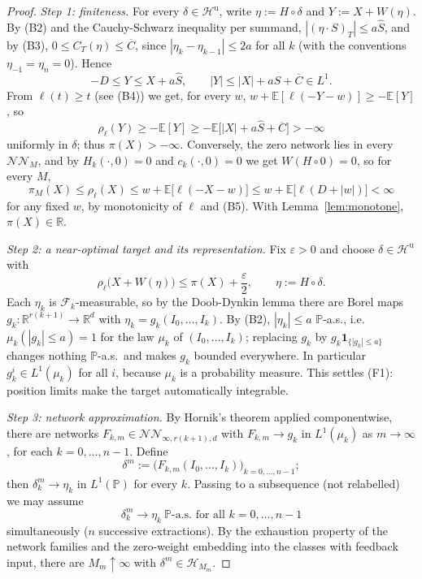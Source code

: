 \documentclass[11pt,a4paper]{report}
\numberwithin{equation}{chapter}
\theoremstyle{plain}
\theoremstyle{definition}
\newcommand{\E}{\mathbb{E}}
\newcommand{\PP}{\mathbb{P}}
\newcommand{\R}{\mathbb{R}}
\newcommand{\F}{\mathcal{F}}
\newcommand{\HH}{\mathcal{H}}
\newcommand{\Hu}{\mathcal{H}^{\mathrm{u}}}
\newcommand{\NNet}{\mathcal{N\!N}}
\newcommand{\as}{\ \PP\text{-a.s.}}
\begin{document}
\begin{proof}
    \emph{Step 1: finiteness.} For every $\delta\in\Hu$, write $\eta:=H\circ\delta$ and $Y:=X+W(\eta)$. By (B2) and the Cauchy-Schwarz inequality per summand, $|(\eta\cdot S)_T|\le a\widehat S$, and by (B3), $0\le C_T(\eta)\le\overline C$, since $|\eta_k-\eta_{k-1}|\le2a$ for all $k$ (with the conventions $\eta_{-1}=\eta_n=0$). Hence
    \begin{equation}\label{eq:sandwich}
        -D\le Y\le X+a\widehat S,\qquad|Y|\le|X|+a\widehat S+\overline C\in L^1.
    \end{equation}
    From $\ell(t)\ge t$ (see (B4)) we get, for every $w$, $w+\E[\ell(-Y-w)]\ge-\E[Y]$, so
    \[
        \rho_\ell(Y)\ge-\E[Y]\ge-\E\bigl[|X|+a\widehat S+\overline C\bigr]>-\infty
    \]
    uniformly in $\delta$; thus $\pi(X)>-\infty$. Conversely, the zero network lies in every $\NNet_M$, and by $H_k(\cdot,0)=0$ and $c_k(\cdot,0)=0$ we get $W(H\circ0)=0$, so for every $M$,
    \[
        \pi_M(X)\le\rho_\ell(X)\le w+\E\bigl[\ell(-X-w)\bigr]\le w+\E\bigl[\ell(D+|w|)\bigr]<\infty
    \]
    for any fixed $w$, by monotonicity of $\ell$ and (B5). With Lemma~\ref{lem:monotone}, $\pi(X)\in\R$.

    \emph{Step 2: a near-optimal target and its representation.} Fix $\varepsilon>0$ and choose $\delta\in\Hu$ with
    \begin{equation}\label{eq:near-opt}
        \rho_\ell\bigl(X+W(\eta)\bigr)\le\pi(X)+\frac{\varepsilon}{2},\qquad\eta:=H\circ\delta.
    \end{equation}
    Each $\eta_k$ is $\F_k$-measurable, so by the Doob-Dynkin lemma \cite[Lemma~1.13]{kallenberg} there are Borel maps $g_k\colon\R^{r(k+1)}\to\R^d$ with $\eta_k=g_k(I_0,\dots,I_k)$. By (B2), $|\eta_k|\le a$ $\PP$-a.s., i.e.\ $\mu_k(|g_k|\le a)=1$ for the law $\mu_k$ of $(I_0,\dots,I_k)$; replacing $g_k$ by $g_k\mathbf{1}_{\{|g_k|\le a\}}$ changes nothing $\PP$-a.s.\ and makes $g_k$ bounded everywhere. In particular $g_k^i\in L^1(\mu_k)$ for all $i$, because $\mu_k$ is a probability measure. This settles (F1): position limits make the target automatically integrable.

    \emph{Step 3: network approximation.} By Hornik's theorem \cite[Theorem~1]{hornik} applied componentwise, there are networks $F_{k,m}\in\NNet_{\infty,r(k+1),d}$ with $F_{k,m}\to g_k$ in $L^1(\mu_k)$ as $m\to\infty$, for each $k=0,\dots,n-1$. Define
    \[
        \delta^m:=\bigl(F_{k,m}(I_0,\dots,I_k)\bigr)_{k=0,\dots,n-1};
    \]
    then $\delta^m_k\to\eta_k$ in $L^1(\PP)$ for every $k$. Passing to a subsequence (not relabelled) we may assume
    \begin{equation}\label{eq:as-convergence}
        \delta^m_k\longrightarrow\eta_k\as\text{ for all }k=0,\dots,n-1
    \end{equation}
    simultaneously ($n$ successive extractions). By the exhaustion property of the network families and the zero-weight embedding into the classes with feedback input, there are $M_m\uparrow\infty$ with $\delta^m\in\HH_{M_m}$.


\end{proof}
\end{document}
